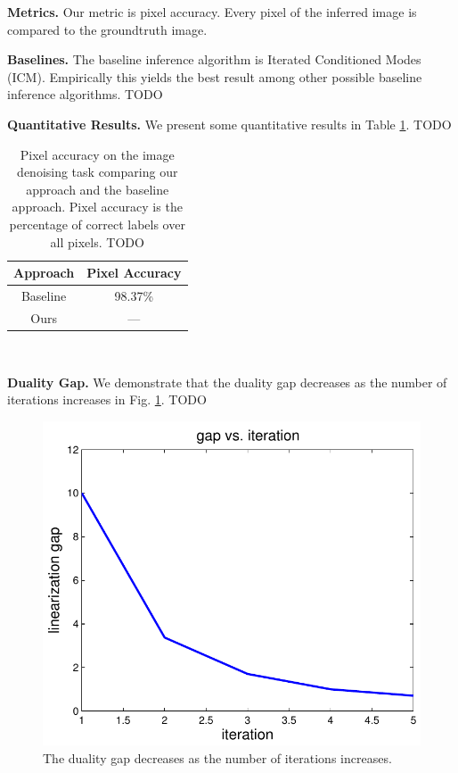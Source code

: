 \documentclass[conference]{IEEEtran}
\begin{document}
{\bf Metrics.} Our metric is pixel accuracy. Every pixel of the inferred image is compared to the groundtruth image.

{\bf Baselines.} The baseline inference algorithm is Iterated Conditioned Modes (ICM). Empirically this yields the best result among other possible baseline inference algorithms. TODO

{\bf Quantitative Results.} We present some quantitative results in Table \ref{tab:denoising_accuracy}. TODO

\begin{table}[!h]
    \centering
	    \begin{tabular}{|c|c|}
	    	\hline
			Approach & Pixel Accuracy \\ \hline
			Baseline & 98.37\% \\ \hline
			Ours & --- \\ \hline
		\end{tabular}\\
    \caption{Pixel accuracy on the image denoising task comparing our approach and the baseline approach. Pixel accuracy is the percentage of correct labels over all pixels. TODO}\label{tab:denoising_accuracy}
\end{table}

{\bf Duality Gap.} We demonstrate that the duality gap decreases as the number of iterations increases in Fig. \ref{fig:denoisinggap}. TODO

\begin{figure}
\centering
\includegraphics[width=.75\columnwidth]{img/fwdd_gap.pdf}
\caption{The duality gap decreases as the number of iterations increases.}
\label{fig:denoisinggap}
\end{figure}
\end{document}
